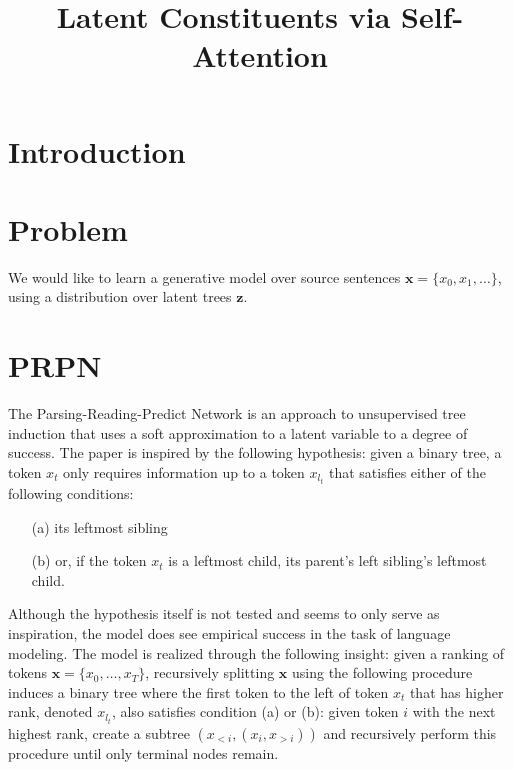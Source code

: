 \documentclass{article}
\title{Latent Constituents via Self-Attention}
\newcommand{\bx}{\mathbf{x}}
\newcommand{\bz}{\mathbf{z}}
\begin{document}
\maketitle

\section{Introduction}


\section{Problem}
We would like to learn a generative model
over source sentences $\bx = \{x_0, x_1, \ldots\}$,
using a distribution over latent trees $\bz$.  
\citep{shen2018prpn}
\citet{yin18structvae}

\section{PRPN \citep{shen2018prpn}}
The Parsing-Reading-Predict Network \citep{shen2018prpn} is an approach to unsupervised tree induction
that uses a soft approximation to a latent variable to a degree of success.
The paper is inspired by the following hypothesis:
given a binary tree, a token $x_t$ only requires information up to a token $x_{l_t}$ that satisfies
either of the following conditions:
\begin{itemize}
\item[(a)] its leftmost sibling
\item[(b)] or, if the token $x_t$ is a leftmost child, its parent's left sibling's leftmost child.
\end{itemize}
Although the hypothesis itself is not tested and seems to only serve as inspiration,
the model does see empirical success in the task of language modeling.
The model is realized through the following insight: given a ranking of tokens $\bx = \{x_0,\ldots,x_T\}$,
recursively splitting $\bx$ using the following procedure induces a binary tree where the first token to the left
of token $x_t$ that has higher rank, denoted $x_{l_t}$, also satisfies condition (a) or (b):
given token $i$ with the next highest rank, create a subtree $(x_{<i}, (x_i, x_{>i}))$ and
recursively perform this procedure until only terminal nodes remain.
\end{document}
